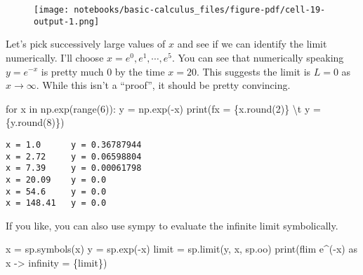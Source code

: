 \documentclass[
  letterpaper,
  DIV=11,
  numbers=noendperiod]{scrreprt}
\newenvironment{Shaded}{\begin{snugshade}}{\end{snugshade}}
\newcommand{\BuiltInTok}[1]{\textcolor[rgb]{0.00,0.23,0.31}{#1}}
\newcommand{\CharTok}[1]{\textcolor[rgb]{0.13,0.47,0.30}{#1}}
\newcommand{\ControlFlowTok}[1]{\textcolor[rgb]{0.00,0.23,0.31}{#1}}
\newcommand{\DecValTok}[1]{\textcolor[rgb]{0.68,0.00,0.00}{#1}}
\newcommand{\KeywordTok}[1]{\textcolor[rgb]{0.00,0.23,0.31}{#1}}
\newcommand{\NormalTok}[1]{\textcolor[rgb]{0.00,0.23,0.31}{#1}}
\newcommand{\OperatorTok}[1]{\textcolor[rgb]{0.37,0.37,0.37}{#1}}
\newcommand{\SpecialCharTok}[1]{\textcolor[rgb]{0.37,0.37,0.37}{#1}}
\newcommand{\SpecialStringTok}[1]{\textcolor[rgb]{0.13,0.47,0.30}{#1}}
\newcommand{\StringTok}[1]{\textcolor[rgb]{0.13,0.47,0.30}{#1}}
\begin{document}
\begin{figure}[H]

{\centering \texttt{[image: notebooks/basic-calculus\_files/figure-pdf/cell-19-output-1.png]}

}

\end{figure}

Let's pick successively large values of \(x\) and see if we can identify
the limit numerically. I'll choose \(x=e^0, e^1, \cdots, e^5\). You can
see that numerically speaking \(y=e^{-x}\) is pretty much \(0\) by the
time \(x=20\). This suggests the limit is \(L=0\) as
\(x \rightarrow \infty\). While this isn't a ``proof'', it should be
pretty convincing.

\begin{Shaded}
\begin{Highlighting}[]
\ControlFlowTok{for}\NormalTok{ x }\KeywordTok{in}\NormalTok{ np.exp(}\BuiltInTok{range}\NormalTok{(}\DecValTok{6}\NormalTok{)):}
\NormalTok{    y }\OperatorTok{=}\NormalTok{ np.exp(}\OperatorTok{{-}}\NormalTok{x)}
    \BuiltInTok{print}\NormalTok{(}\SpecialStringTok{f\textquotesingle{}x = }\SpecialCharTok{\{}\NormalTok{x}\SpecialCharTok{.}\BuiltInTok{round}\NormalTok{(}\DecValTok{2}\NormalTok{)}\SpecialCharTok{\}}\SpecialStringTok{ }\CharTok{\textbackslash{}t}\SpecialStringTok{ y = }\SpecialCharTok{\{}\NormalTok{y}\SpecialCharTok{.}\BuiltInTok{round}\NormalTok{(}\DecValTok{8}\NormalTok{)}\SpecialCharTok{\}}\SpecialStringTok{\textquotesingle{}}\NormalTok{)}
\end{Highlighting}
\end{Shaded}

\begin{verbatim}
x = 1.0      y = 0.36787944
x = 2.72     y = 0.06598804
x = 7.39     y = 0.00061798
x = 20.09    y = 0.0
x = 54.6     y = 0.0
x = 148.41   y = 0.0
\end{verbatim}

If you like, you can also use sympy to evaluate the infinite limit
symbolically.

\begin{Shaded}
\begin{Highlighting}[]
\NormalTok{x }\OperatorTok{=}\NormalTok{ sp.symbols(}\StringTok{\textquotesingle{}x\textquotesingle{}}\NormalTok{)}
\NormalTok{y }\OperatorTok{=}\NormalTok{ sp.exp(}\OperatorTok{{-}}\NormalTok{x)}
\NormalTok{limit }\OperatorTok{=}\NormalTok{ sp.limit(y, x, sp.oo)}
\BuiltInTok{print}\NormalTok{(}\SpecialStringTok{f\textquotesingle{}lim e\^{}({-}x) as x {-}\textgreater{} infinity = }\SpecialCharTok{\{}\NormalTok{limit}\SpecialCharTok{\}}\SpecialStringTok{\textquotesingle{}}\NormalTok{)}
\end{Highlighting}
\end{Shaded}
\end{document}
